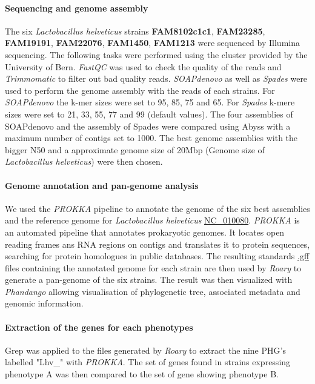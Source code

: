\documentclass[10pt,a4paper]{article}
\begin{document}
\paragraph{Sequencing and genome assembly}
The six \textit{Lactobacillus helveticus} strains \textbf{FAM8102c1c1}, \textbf{FAM23285}, \textbf{FAM19191}, \textbf{FAM22076}, \textbf{FAM1450}, \textbf{FAM1213}  were sequenced by Illumina sequencing. The following tasks were performed using the cluster provided by the University of Bern.  \textit{FastQC} was used to check the quality of the reads and \textit{Trimmomatic} to filter out bad quality reads. \textit{SOAPdenovo} as well as \textit{Spades} were used to perform the genome assembly with the reads of each strains. For \textit{SOAPdenovo} the k-mer sizes were set to 95, 85, 75 and 65. For \textit{Spades} k-mere sizes were set to 21, 33, 55, 77 and 99 (default values). The four assemblies of SOAPdenovo and the assembly of Spades were compared using Abyss with a maximum number of contigs set to 1000. The best genome assemblies with the bigger N50 and a approximate genome size of 20Mbp (Genome size of \textit{Lactobacillus helveticus}) were then chosen.


\paragraph{Genome annotation and pan-genome analysis}
We used the \textit{PROKKA} pipeline\cite{seemann_prokka:_2014} to annotate the genome of the six best assemblies and the reference genome for \textit{Lactobacillus helveticus} \href{https://www.ncbi.nlm.nih.gov/genome/?term=NC_010080}{NC\_010080}. \textit{PROKKA} is an automated pipeline that annotates prokaryotic genomes. It locates open reading frames ans RNA regions on contigs and translates it to protein sequences, searching for protein homologues in public databases. The resulting standards \href{https://www.ensembl.org/info/website/upload/gff.html}{.gff} files containing the annotated genome for each strain are then used by \textit{Roary}\cite{page_roary:_2015} to generate a pan-genome of the six strains. The result was then visualized with \textit{Phandango}\cite{hadfield_phandango:_2018} allowing visualisation of phylogenetic tree, associated metadata and genomic information.


\paragraph{Extraction of the genes for each phenotypes} Grep was applied to the files generated by \textit{Roary} to extract the nine PHG's \cite{jebava_nine_2011} labelled "Lhv\_" with \textit{PROKKA}. The set of genes found in strains expressing phenotype A was then compared to the set of gene showing phenotype B. %
\end{document}
